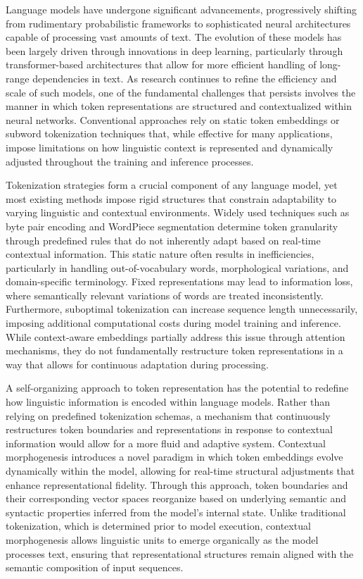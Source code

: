 \documentclass{article}
\begin{document}
Language models have undergone significant advancements, progressively shifting from rudimentary probabilistic frameworks to sophisticated neural architectures capable of processing vast amounts of text. The evolution of these models has been largely driven through innovations in deep learning, particularly through transformer-based architectures that allow for more efficient handling of long-range dependencies in text. As research continues to refine the efficiency and scale of such models, one of the fundamental challenges that persists involves the manner in which token representations are structured and contextualized within neural networks. Conventional approaches rely on static token embeddings or subword tokenization techniques that, while effective for many applications, impose limitations on how linguistic context is represented and dynamically adjusted throughout the training and inference processes.

Tokenization strategies form a crucial component of any language model, yet most existing methods impose rigid structures that constrain adaptability to varying linguistic and contextual environments. Widely used techniques such as byte pair encoding and WordPiece segmentation determine token granularity through predefined rules that do not inherently adapt based on real-time contextual information. This static nature often results in inefficiencies, particularly in handling out-of-vocabulary words, morphological variations, and domain-specific terminology. Fixed representations may lead to information loss, where semantically relevant variations of words are treated inconsistently. Furthermore, suboptimal tokenization can increase sequence length unnecessarily, imposing additional computational costs during model training and inference. While context-aware embeddings partially address this issue through attention mechanisms, they do not fundamentally restructure token representations in a way that allows for continuous adaptation during processing.

A self-organizing approach to token representation has the potential to redefine how linguistic information is encoded within language models. Rather than relying on predefined tokenization schemas, a mechanism that continuously restructures token boundaries and representations in response to contextual information would allow for a more fluid and adaptive system. Contextual morphogenesis introduces a novel paradigm in which token embeddings evolve dynamically within the model, allowing for real-time structural adjustments that enhance representational fidelity. Through this approach, token boundaries and their corresponding vector spaces reorganize based on underlying semantic and syntactic properties inferred from the model’s internal state. Unlike traditional tokenization, which is determined prior to model execution, contextual morphogenesis allows linguistic units to emerge organically as the model processes text, ensuring that representational structures remain aligned with the semantic composition of input sequences.
\end{document}
